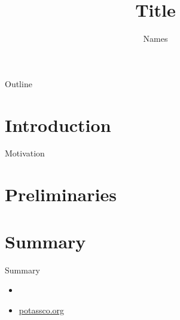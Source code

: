 \documentclass[t]{beamer}
\title{Title}
\author{Names}
\institute[KRR@UP]{University of Potsdam \&\ Potassco Solutions GmbH \\
  \bigskip
  \texttt{[image: potassco\_logo\_lightblue]}}
\date{}
\begin{document}
\frame{\titlepage}
\begin{frame}{Outline}
  \bigskip
  \vfill
  \tableofcontents
\end{frame}
\section{Introduction}
\begin{frame}{Motivation}
\end{frame}
\section{Preliminaries}
\begin{frame}{}
\end{frame}
\section{Summary}
\begin{frame}{Summary}
  \begin{itemize}
  \item
  \item \url{potassco.org}
  \end{itemize}
\end{frame}
\end{document}
